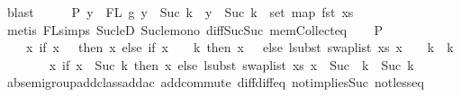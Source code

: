 \begin{isabellebody}
\ blast\isanewline
\ \ \isamarkupfalse%
\ \isamarkupfalse%
\ P{}{\isacharcolon}{\kern0pt}\ {\isachardoublequoteopen}{\isasymforall}y\ {\isasymin}\ FL\ g{\isacharprime}{\kern0pt}{\isachardot}{\kern0pt}\ y\ {\isachargreater}{\kern0pt}{\isacharequal}{\kern0pt}\ Suc\ k\ {\isacharminus}{\kern0pt}{\isacharminus}{\kern0pt}{\isachargreater}{\kern0pt}\ y\ {\isacharminus}{\kern0pt}\ {\isacharparenleft}{\kern0pt}Suc\ k{\isacharparenright}{\kern0pt}\ {\isasymin}\ set\ {\isacharparenleft}{\kern0pt}map\ fst\ xs{\isacharparenright}{\kern0pt}{\isachardoublequoteclose}\isanewline
\ \ \ \ \isamarkupfalse%
\ {\isacharparenleft}{\kern0pt}metis\ FL{\isachardot}{\kern0pt}simps{\isacharparenleft}{\kern0pt}{}{\isacharparenright}{\kern0pt}\ Suc{\isacharunderscore}{\kern0pt}le{\isacharunderscore}{\kern0pt}D\ Suc{\isacharunderscore}{\kern0pt}le{\isacharunderscore}{\kern0pt}mono\ diff{\isacharunderscore}{\kern0pt}Suc{\isacharunderscore}{\kern0pt}Suc\ mem{\isacharunderscore}{\kern0pt}Collect{\isacharunderscore}{\kern0pt}eq{\isacharparenright}{\kern0pt}\isanewline
\isanewline
\ \ \isamarkupfalse%
\ P{}{\isacharcolon}{\kern0pt}\isanewline
\ \ \ \ {\isachardoublequoteopen}{\isacharparenleft}{\kern0pt}{\isasymlambda}x{\isachardot}{\kern0pt}\ if\ x\ {\isacharequal}{\kern0pt}\ {}\ then\ x\ else\ {\isacharparenleft}{\kern0pt}if\ x\ {\isacharminus}{\kern0pt}\ {}\ {\isacharless}{\kern0pt}\ k\ then\ x\ {\isacharminus}{\kern0pt}\ {}\ else\ lsubst\ {\isacharparenleft}{\kern0pt}swap{\isacharunderscore}{\kern0pt}list\ xs{\isacharparenright}{\kern0pt}\ {\isacharparenleft}{\kern0pt}x\ {\isacharminus}{\kern0pt}\ {}\ {\isacharminus}{\kern0pt}\ k{\isacharparenright}{\kern0pt}\ {\isacharplus}{\kern0pt}\ k{\isacharparenright}{\kern0pt}\ {\isacharplus}{\kern0pt}\ {}{\isacharparenright}{\kern0pt}\ {\isacharequal}{\kern0pt}\isanewline
\ \ \ \ {\isacharparenleft}{\kern0pt}{\isasymlambda}x{\isachardot}{\kern0pt}\ if\ x\ {\isacharless}{\kern0pt}\ Suc\ k\ then\ x\ else\ lsubst\ {\isacharparenleft}{\kern0pt}swap{\isacharunderscore}{\kern0pt}list\ xs{\isacharparenright}{\kern0pt}\ {\isacharparenleft}{\kern0pt}x\ {\isacharminus}{\kern0pt}\ {\isacharparenleft}{\kern0pt}Suc\ \ k{\isacharparenright}{\kern0pt}{\isacharparenright}{\kern0pt}\ {\isacharplus}{\kern0pt}\ {\isacharparenleft}{\kern0pt}Suc\ k{\isacharparenright}{\kern0pt}{\isacharparenright}{\kern0pt}{\isachardoublequoteclose}\isanewline
\ \ \ \ \isamarkupfalse%
\ ab{\isacharunderscore}{\kern0pt}semigroup{\isacharunderscore}{\kern0pt}add{\isacharunderscore}{\kern0pt}class{\isachardot}{\kern0pt}add{\isacharunderscore}{\kern0pt}ac{\isacharparenleft}{\kern0pt}{}{\isacharparenright}{\kern0pt}\ add{\isachardot}{\kern0pt}commute\ diff{\isacharunderscore}{\kern0pt}diff{\isacharunderscore}{\kern0pt}eq\ not{}{\isacharunderscore}{\kern0pt}implies{\isacharunderscore}{\kern0pt}Suc\ not{\isacharunderscore}{\kern0pt}less{\isacharunderscore}{\kern0pt}eq\isanewline

\end{isabellebody}
